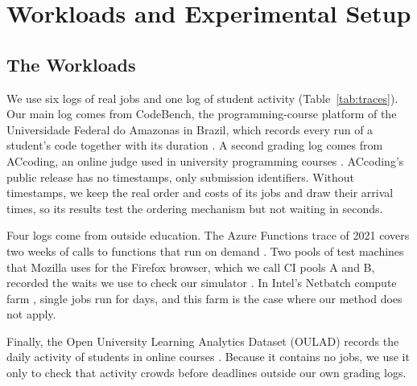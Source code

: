 \providecommand{\devnum}[1]{#1}

\section{Workloads and Experimental Setup}
\label{sec:data}

\subsection{The Workloads}
\label{sec:fields}

We use six logs of real jobs and one log of student activity (Table~\ref{tab:traces}). Our
main log comes from CodeBench, the programming-course platform of the Universidade Federal do
Amazonas in Brazil, which records every run of a student's code together with its duration
\cite{codebench_dataset}. A second grading log comes from ACcoding, an online judge used in
university programming courses \cite{accoding2024}. ACcoding's public release has no
timestamps, only submission identifiers. Without timestamps, we keep the real order and
costs of its jobs and draw their arrival times, so its results test the ordering mechanism
but not waiting in seconds.

Four logs come from outside education. The Azure Functions trace of 2021 covers two weeks of
calls to functions that run on demand \cite{azure2021trace,zhang2021harvested}. Two pools of
test machines that Mozilla uses for the Firefox browser, which we call CI pools A and B,
recorded the waits we use to check our simulator \cite{taskcluster_docs,treeherder_docs}.
In Intel's Netbatch compute farm \cite{netbatch2012trace,shai2014netbatch}, single jobs run
for days, and this farm is the case where our method does not apply.

Finally, the Open University Learning Analytics Dataset (OULAD) records the daily activity
of students in online courses \cite{oulad2017}. Because it contains no jobs, we use it only
to check that activity crowds before deadlines outside our own grading logs.

